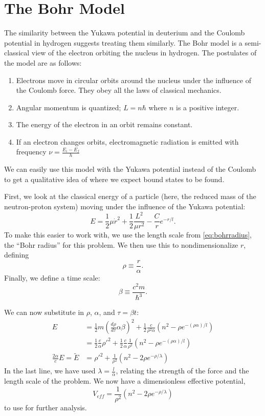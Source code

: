 \documentclass[12pt,twoside]{reedthesis}
\newcommand{\eqn}[1]{\begin{equation}#1\end{equation}}
\begin{document}
\section{The Bohr Model}
The similarity between the Yukawa potential in deuterium and the Coulomb potential in hydrogen suggests treating them similarly. The Bohr model is a semi-classical view of the electron orbiting the nucleus in hydrogen. The postulates of the model are as follows:
\begin{enumerate}
\item Electrons move in circular orbits around the nucleus under the influence of the Coulomb force. They obey all the laws of classical mechanics.
\item Angular momentum is quantized; $L = n\hbar$ where $n$ is a positive integer.
\item The energy of the electron in an orbit remains constant.
\item If an electron changes orbits, electromagnetic radiation is emitted with frequency $\nu = \frac{E_i-E_f}{h}$
\end{enumerate}
We can easily use this model with the Yukawa potential instead of the Coulomb to get a qualitative idea of where we expect bound states to be found.

First, we look at the classical energy of a particle (here, the reduced mass of the neutron-proton system) moving under the influence of the Yukawa potential:
\eqn{
E = \frac{1}{2}\mu \dot{r}^2+\frac{1}{2}\frac{L^2}{\mu r^2}-\frac{C}{r}e^{-r/l}\mbox{.}
\label{eq:classical-energy}
}
To make this easier to work with, we use the length scale from \eqref{eq:bohrradius}, the ``Bohr radius'' for this problem. We then use this to nondimensionalize $r$, defining
\begin{equation}
\rho \equiv \frac{r}{\alpha}\mbox{.}
\label{eq:rho}
\end{equation}
Finally, we define a time scale:
\begin{equation}
\beta \equiv \frac{c^2m}{\hbar^3}\mbox{.}
\label{eq:beta}
\end{equation}

We can now substitute in $\rho$, $\alpha$, and $\tau = \beta t$:
\begin{align}
E &= \frac{1}{2}m\left(\frac{d\rho}{d \tau}\alpha \beta\right)^2+\frac{1}{2}\frac{c}{\rho^2 \alpha}(n^2-\rho e^{-(\rho \alpha)/l}) \\
&= \frac{1}{2}\frac{c}{\alpha}\rho'^2 + \frac{1}{2}\frac{c}{\alpha}\frac{1}{\rho^2}(n^2-\rho e^{-(\rho \alpha)/l}) \\
\frac{2\alpha}{c}E = \tilde{E} &= \rho'^2 +\frac{1}{\rho^2}(n^2 - 2\rho e^{-\rho/ \lambda})
\end{align}
In the last line, we have used $\lambda = \frac{l}{\alpha}$, relating the strength of the force and the length scale of the problem. 
We now have a dimensionless effective potential,
\begin{equation}
V_{eff}=\frac{1}{\rho^2}(n^2- 2\rho e^{-\rho/\lambda})
\label{veff}
\end{equation}
to use for further analysis.
\end{document}
